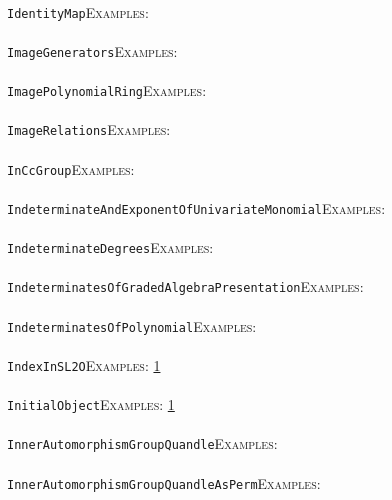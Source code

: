 \documentclass[a4paper,11pt]{report}
\begin{document}
{{ \\
 \texttt{IdentityMap}{\nobreakspace}{\nobreakspace}{\nobreakspace}{\nobreakspace}\textsc{Examples:} \\
 \\
 \texttt{ImageGenerators}{\nobreakspace}{\nobreakspace}{\nobreakspace}{\nobreakspace}\textsc{Examples:} \\
 \\
 \texttt{ImagePolynomialRing}{\nobreakspace}{\nobreakspace}{\nobreakspace}{\nobreakspace}\textsc{Examples:} \\
 \\
 \texttt{ImageRelations}{\nobreakspace}{\nobreakspace}{\nobreakspace}{\nobreakspace}\textsc{Examples:} \\
 \\
 \texttt{InCcGroup}{\nobreakspace}{\nobreakspace}{\nobreakspace}{\nobreakspace}\textsc{Examples:} \\
 \\
 \texttt{IndeterminateAndExponentOfUnivariateMonomial}{\nobreakspace}{\nobreakspace}{\nobreakspace}{\nobreakspace}\textsc{Examples:} \\
 \\
 \texttt{IndeterminateDegrees}{\nobreakspace}{\nobreakspace}{\nobreakspace}{\nobreakspace}\textsc{Examples:} \\
 \\
 \texttt{IndeterminatesOfGradedAlgebraPresentation}{\nobreakspace}{\nobreakspace}{\nobreakspace}{\nobreakspace}\textsc{Examples:} \\
 \\
 \texttt{IndeterminatesOfPolynomial}{\nobreakspace}{\nobreakspace}{\nobreakspace}{\nobreakspace}\textsc{Examples:} \\
 \\
 \texttt{IndexInSL2O}{\nobreakspace}{\nobreakspace}{\nobreakspace}{\nobreakspace}\textsc{Examples:} \href{tutorial/chap10.html} {1}{\nobreakspace} \\
 \\
 \texttt{InitialObject}{\nobreakspace}{\nobreakspace}{\nobreakspace}{\nobreakspace}\textsc{Examples:} \href{../www/SideLinks/About/aboutAbelianCategories.html} {1}{\nobreakspace} \\
 \\
 \texttt{InnerAutomorphismGroupQuandle}{\nobreakspace}{\nobreakspace}{\nobreakspace}{\nobreakspace}\textsc{Examples:} \\
 \\
 \texttt{InnerAutomorphismGroupQuandleAsPerm}{\nobreakspace}{\nobreakspace}{\nobreakspace}{\nobreakspace}\textsc{Examples:} \\
}}
\end{document}
